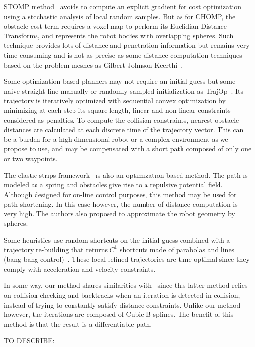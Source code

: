 \documentclass{tADR2e}
\begin{document}
STOMP method~\cite{KalakrishnanStomp} avoids to compute an 
explicit gradient for cost optimization using a stochastic analysis of local 
random samples. But as for CHOMP, the obstacle cost term requires a voxel map to 
perform its Euclidian Distance Transforms, and represents the robot bodies with 
overlapping spheres. Such technique provides lots of distance and penetration 
information but remains very time consuming and is not as precise as some 
distance computation techniques based on the problem meshes as 
Gilbert-Johnson-Keerthi~\cite{gilbertGjk}.

Some optimization-based planners may not require an initial guess but some naive 
straight-line manually or randomly-sampled initialization as 
TrajOp~\cite{SchulmanConvexOptim}. Its trajectory is iteratively optimized with 
sequential convex optimization by minimizing at each step its square length, 
linear and non-linear constraints considered as penalties. To compute the 
collision-constraints, nearest obstacle distances are calculated at each discrete 
time of the trajectory vector. This can be a burden for a high-dimensional robot 
or a complex environment as we propose to use, and may be compensated with a 
short path composed of only one or two waypoints.


The elastic strips framework~\cite{BrockElasticStrips} is also an optimization 
based method. The path is modeled as a spring and obstacles give rise to a 
repulsive potential field. Although designed for on-line control purposes, this 
method may be used for path shortening. In this case however, the number of 
distance computation is very high. The authors also proposed to approximate the 
robot geometry by spheres.

Some heuristics use random shortcuts on the initial guess combined with a 
trajectory re-building that returns ${C}^1$ shortcuts made of parabolas and lines 
(bang-bang control)~\cite{HauserFastSmooth}. These local refined trajectories 
are time-optimal since they comply with acceleration and velocity constraints. 

In some way, our method shares similarities with~\cite{PanSmoothSplineShort} 
since this latter method relies on collision checking and backtracks when an 
iteration is detected in collision, instead of trying to constantly satisfy 
distance constraints. Unlike our method however, the iterations are composed of 
Cubic-B-splines. The benefit of this method is that the result is a 
differentiable path.

TO DESCRIBE:
\end{document}
